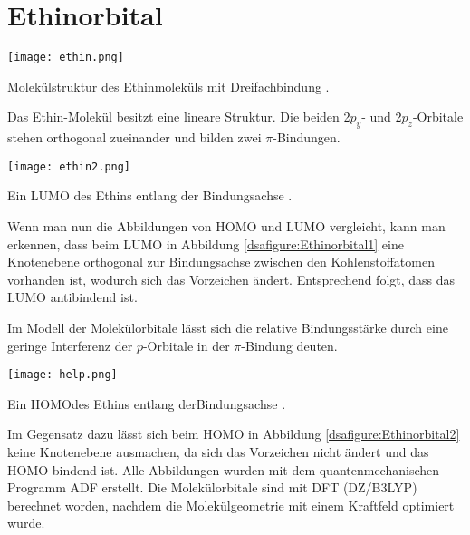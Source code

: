 \section{Ethinorbital}
 
\begin{dsafigure}
 \centering
 \texttt{[image: ethin.png]} 
 \caption{Molekülstruktur des Ethinmoleküls mit Dreifachbindung \cite{ADF2017authors}.}
 \label{dsafigure}
\end{dsafigure} 

Das Ethin-Molekül besitzt eine lineare Struktur. Die beiden 2$p_y$- und 2$p_z$-Orbitale stehen orthogonal zueinander und bilden zwei $\pi$-Bindungen.

\begin{dsafigure}
 \centering
 \texttt{[image: ethin2.png]}
 \caption{Ein LUMO des Ethins entlang der Bindungsachse \cite{ADF2017authors}.}
 \label{dsafigure:Ethinorbital1}
\end{dsafigure}
 
Wenn man nun die Abbildungen von HOMO und LUMO vergleicht, kann man erkennen, dass beim LUMO in Abbildung \ref{dsafigure:Ethinorbital1} eine Knotenebene orthogonal zur Bindungsachse zwischen den Kohlenstoffatomen vorhanden ist, wodurch sich das Vorzeichen ändert. Entsprechend folgt, dass das LUMO antibindend ist.

Im Modell der Molekülorbitale lässt sich die relative Bindungsstärke durch eine geringe Interferenz der $p$-Orbitale in der $\pi$-Bindung deuten.

\begin{dsafigure}
 \centering
 \texttt{[image: help.png]}
 \caption{Ein HOMOdes Ethins entlang derBindungsachse \cite{ADF2017authors}.}
 \label{dsafigure:Ethinorbital2}
\end{dsafigure}

Im Gegensatz dazu lässt sich beim HOMO in Abbildung \ref{dsafigure:Ethinorbital2} keine Knotenebene ausmachen, da sich das Vorzeichen nicht ändert und das HOMO bindend ist.
Alle Abbildungen wurden mit dem quantenmechanischen Programm ADF erstellt. Die Molekülorbitale sind mit DFT (DZ/B3LYP) berechnet worden, nachdem die Molekülgeometrie mit einem Kraftfeld optimiert wurde.
